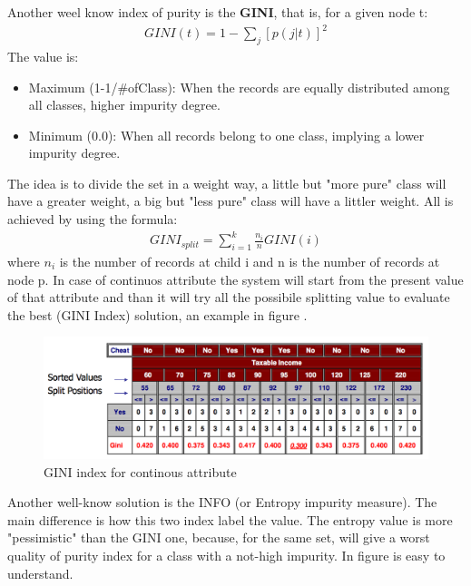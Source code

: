 \documentclass[12pt]{article}
\begin{document}
Another weel know index of purity is the \textbf{GINI}, that is, for a given node t:
\begin{equation}
  \begin{gathered}
    GINI(t) = 1 - \sum_{j} [p(j|t)]^{2}
  \end{gathered}
\end{equation}
The value is:
\begin{itemize}
  \item Maximum (1-1/\#ofClass): When the records are equally distributed among all classes, higher impurity degree.
  \item Minimum (0.0): When all records belong to one class, implying a lower impurity degree.
\end{itemize}
The idea is to divide the set in a weight way, a little but "more pure" class will have a greater weight, a big but "less pure" class will have a littler weight. All is achieved by using the formula:
\begin{equation}
  \begin{gathered}
    GINI_{split} = \sum_{i=1}^{k} \frac{n_i}{n} GINI(i)
  \end{gathered}
\end{equation}
where $n_i$ is the number of records at child i and n is the number of records at node p. In case of continuos attribute the system will start from the present value of that attribute and than it will try all the possibile splitting value to evaluate the best (GINI Index) solution, an example in figure .
\begin{figure}[H]
  \includegraphics[width=\linewidth]{images/gini_cont.png}
  \caption{GINI index for continous attribute}
  \label{fig:gini_cont}
\end{figure}
Another well-know solution is the INFO (or Entropy impurity measure). The main difference is how this two index label the value. The entropy value is more "pessimistic" than the GINI one, because, for the same set, will give a worst quality of purity index for a class with a not-high impurity. In figure is easy to understand.
\end{document}
